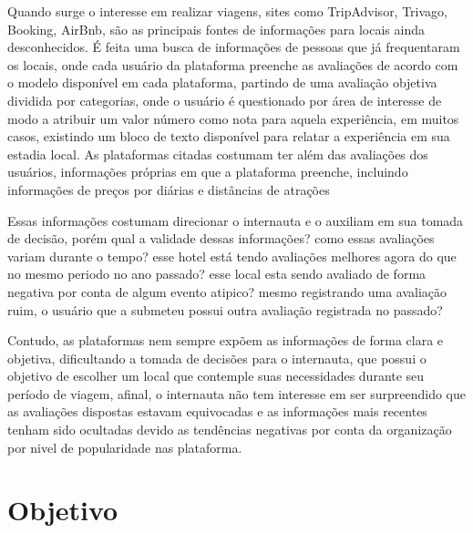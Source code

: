Quando surge o interesse em realizar viagens, sites como TripAdvisor, Trivago, Booking, AirBnb, são as principais fontes de informações para locais ainda desconhecidos. É feita uma busca de informações de pessoas que já frequentaram os locais, onde cada usuário da plataforma preenche as avaliações de acordo com o modelo disponível em cada plataforma, partindo de uma avaliação objetiva dividida por categorias, onde o usuário é questionado por área de interesse de modo a atribuir um valor número como nota para aquela experiência, em muitos casos, existindo um bloco de texto disponível para relatar a experiência em sua estadia local. As plataformas citadas costumam ter além das avaliações dos usuários, informações próprias em que a plataforma preenche, incluindo informações de preços por diárias e distâncias de atrações

Essas informações costumam direcionar o internauta e o auxiliam em sua tomada de decisão, porém qual a validade dessas informações? como essas avaliações variam durante o tempo? esse hotel está tendo avaliações melhores agora do que no mesmo periodo no ano passado? esse local esta sendo avaliado de forma negativa por conta de algum evento atipico? mesmo registrando uma avaliação ruim, o usuário que a submeteu possui outra avaliação registrada no passado?

Contudo, as plataformas nem sempre expõem as informações de forma clara e objetiva, dificultando a tomada de decisões para o internauta, que possui o objetivo de escolher um local que contemple suas necessidades durante seu período de viagem, afinal, o internauta não tem interesse em ser surpreendido que as avaliações dispostas estavam equivocadas e as informações mais recentes tenham sido ocultadas devido as tendências negativas por conta da organização por nivel de popularidade nas plataforma.

\begin{comment}
O presente relatório está estruturado da seguinte forma: o capítulo~\ref{cap:justificativa} apresenta..., o capítulo~\ref{cap:fund_teorica}... O capítulo~\ref{cap:metodologia} ..., o capítulo~\ref{cap:resultados} .... O capítulo~\ref{cap:conclusao} 

Demonstração de citação: o software de análise foi desenvolvido na linguagem Python~\cite{van1995python}, usando as bibliotecas Pandas~\cite{mckinney2010data} e Scikit-learn~\cite{scikit-learn}.
\end{comment}

\section{Objetivo}

